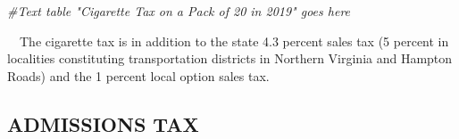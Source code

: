 \documentclass[
]{book}
\newenvironment{Shaded}{\begin{snugshade}}{\end{snugshade}}
\newcommand{\CommentTok}[1]{\textcolor[rgb]{0.56,0.35,0.01}{\textit{#1}}}
\begin{document}
\begin{Shaded}
\begin{Highlighting}[]
\CommentTok{\#Text table "Cigarette Tax on a Pack of 20 in 2019" goes here}
\end{Highlighting}
\end{Shaded}

\hfill\break
~~The cigarette tax is in addition to the state 4.3 percent sales tax (5 percent in localities constituting transportation districts in Northern Virginia and Hampton Roads) and the 1 percent local option sales tax.\\

\hypertarget{admissions-tax}{%
\subsection{ADMISSIONS TAX}\label{admissions-tax}}
\end{document}
